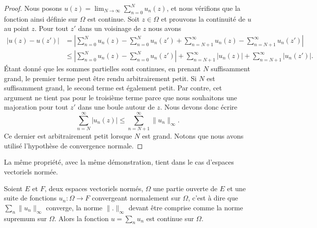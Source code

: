 \begin{proof}
    Nous posons \( u(z)=\lim_{N\to \infty} \sum_{n=0}^N u_n(z)\), et nous vérifions que la fonction ainsi définie sur \( \Omega\) est continue. Soit \( z\in \Omega\) et prouvons la continuité de \( u\) au point \( z\). Pour tout \( z'\) dans un voisinage de \( z\) nous avons 
    \begin{subequations}
        \begin{align}
            \big| u(z)-u(z') \big|&=\left| \sum_{n=0}^{N}u_n(z)-\sum_{n=0}^{N}u_n(z')+\sum_{n=N+1}^{\infty}u_n(z)-\sum_{n=N+1}^{\infty}u_n(z') \right| \\
            &\leq \left| \sum_{n=0}^N u_n(z)-\sum_{n=0}^Nu_n(z') \right| +\sum_{n=N+1}^{\infty}| u_n(z) |+\sum_{n=N+1}^{\infty}| u_n(z') |.
        \end{align}
    \end{subequations}
    Étant donné que les sommes partielles sont continues, en prenant \( N\) suffisamment grand, le premier terme peut être rendu arbitrairement petit. Si \( N\) est suffisamment grand, le second terme est également petit. Par contre, cet argument ne tient pas pour le troisième terme parce que nous souhaitons une majoration pour tout \( z'\) dans une boule autour de \( z\). Nous devons donc écrire
    \begin{equation}
        \sum_{n=N}^{\infty}| u_n(z) |\leq \sum_{n=N+1}^{\infty}\| u_n \|_{\infty}.
    \end{equation}
    Ce dernier est arbitrairement petit lorsque \( N\) est grand. Notons que nous avons utilisé l'hypothèse de convergence normale.
\end{proof}

La même propriété, avec la même démonstration, tient dans le cas d'espaces vectoriels normée.
\begin{proposition} \label{PropOMBbwst}
    Soient \( E\) et \( F\), deux espaces vectoriels normés, \( \Omega\) une partie ouverte de \( E\) et une suite de fonctions \( u_n\colon \Omega\to F\) convergeant normalement sur \( \Omega\), c'est à dire que \( \sum_n\| u_n \|_{\infty}\) converge, la norme \( \| . \|_{\infty} \) devant être comprise comme la norme supremum sur \( \Omega\). Alors la fonction \( u=\sum_nu_n\) est continue sur \( \Omega\).
\end{proposition}

